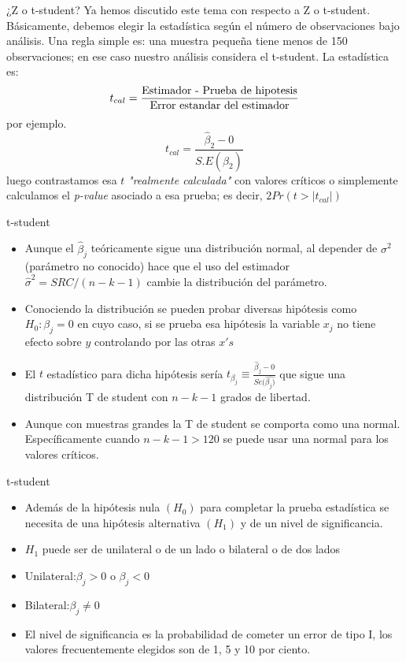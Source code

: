 \begin{frame}{¿Z o t-student?}
	Ya hemos discutido este tema con respecto a Z o t-student. Básicamente, debemos elegir la estadística según el número de observaciones bajo análisis. Una regla simple es: una muestra pequeña tiene menos de 150 observaciones; en ese caso nuestro análisis considera el t-student. La estadística es:
		$$t_{cal} = \frac{\textup{Estimador - Prueba de hipotesis}}{\textup{Error estandar del estimador}}$$
	por ejemplo.
		$$t_{cal}=\frac{\widehat{\beta}_2 - 0}{S.E(\widehat{\beta}_2)}$$
	luego contrastamos esa $t$ \textit{"realmente calculada"} con valores críticos o simplemente calculamos el \textit{p-value} asociado a esa prueba; es decir, $2Pr(t > |t_{cal}|)$
\end{frame}
\begin{frame}{t-student}
	\begin{itemize}
		\item Aunque el $\widehat{\beta}_{j}$ teóricamente sigue una distribución normal, al depender de $\sigma^2$ (parámetro no conocido) hace que el uso del estimador $\widehat{\sigma}^2=SRC/(n-k-1)$ cambie la distribución del parámetro.
		\item Conociendo la distribución se pueden probar diversas hipótesis como $H_{0}:\beta_{j}=0$ en cuyo caso, si se prueba esa hipótesis la variable $x_{j}$ no tiene efecto sobre $y$ controlando por las otras $x's$
		\item El $t$ estadístico para dicha hipótesis sería $t_{\beta_{j}}\equiv \frac{\widehat{\beta}_{j}-0}{Se(\widehat{\beta_{j})}}$ que sigue una distribución T de student con $n-k-1$ grados de libertad.
		\item Aunque con muestras grandes la T de student se comporta como una normal. Específicamente cuando $n-k-1>120$ se puede usar una normal para los valores críticos.
	\end{itemize}
\end{frame}
\begin{frame}{t-student}
	\begin{itemize}
		\item Además de la hipótesis nula $(H_{0})$ para completar la prueba estadística se necesita de una hipótesis alternativa $(H_{1})$ y de un nivel de significancia.
		\item $H_{1}$ puede ser de unilateral o de un lado o bilateral o de dos lados
		\item Unilateral:$\beta_{j}>0$ o  $\beta_{j}<0$
		\item Bilateral:$\beta_{j} \neq 0$
		\item El nivel de significancia es la probabilidad de cometer un error de tipo I, los valores frecuentemente elegidos son de 1, 5 y 10 por ciento.
	\end{itemize}
\end{frame}
